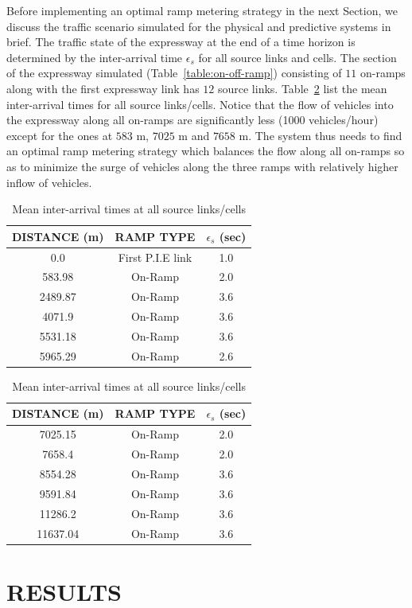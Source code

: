 \documentclass{wscpaperproc}
\theoremstyle{wsc}
\begin{document}
Before implementing an optimal ramp metering strategy in the next Section, we discuss the traffic scenario simulated for the physical and predictive systems in brief. The traffic state of the expressway at the end of a time horizon is determined by the inter-arrival time $\epsilon_s$ for all source links and cells. The section of the expressway simulated (Table~\ref{table:on-off-ramp}) consisting of $11$ on-ramps along with the first expressway link has $12$ source links. Table~\ref{table:iat} list the mean inter-arrival times for all source links/cells. Notice that the flow of vehicles into the expressway along all on-ramps  are significantly less (1000 vehicles/hour) except for the ones at $583$ m, $7025$ m and $7658$ m. The system thus needs to find an optimal ramp metering strategy which balances the flow along all on-ramps so as to minimize the surge of vehicles along the three ramps with relatively higher inflow of vehicles.
\begin{table}[!htbp]
\caption{Mean inter-arrival times at all source links/cells}
\begin{tabular}[b]{ccc}\hline
      {\bf DISTANCE} (m) & {\bf RAMP TYPE} & {\bf $\epsilon_s$} (sec)\\ \hline
     0.0 & First P.I.E link & 1.0\\
     583.98 & On-Ramp & 2.0\\ 
     2489.87 & On-Ramp & 3.6\\ 
     4071.9 & On-Ramp & 3.6\\ 
     5531.18 & On-Ramp & 3.6\\ 
     5965.29 & On-Ramp & 2.6\\ \hline
     \end{tabular}
     \quad
     \begin{tabular}[b]{ccc}\hline
       {\bf DISTANCE} (m) & {\bf RAMP TYPE}& {\bf $\epsilon_s$} (sec) \\ \hline
     7025.15 & On-Ramp & 2.0\\ 
     7658.4 & On-Ramp & 2.0\\ 
     8554.28 & On-Ramp & 3.6\\ 
     9591.84 & On-Ramp & 3.6\\ 
     11286.2 & On-Ramp & 3.6\\ 
     11637.04 & On-Ramp & 3.6\\ \hline
    \end{tabular}
      \label{table:iat}
\end{table}


\section{RESULTS}
\label{sec:results}
\end{document}
